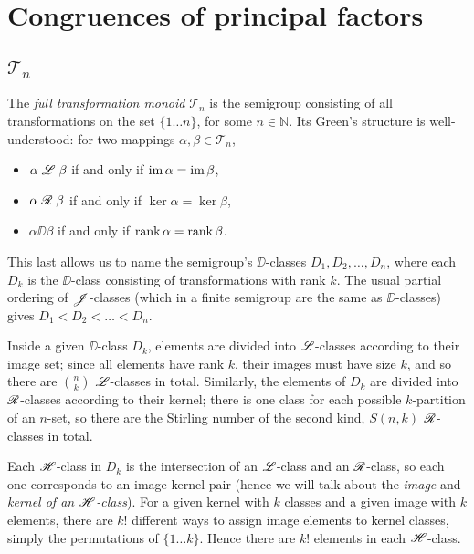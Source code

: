 \chapter{Congruences of principal factors}
\label{chap:princfact}

\section{$\mathcal{T}_n$}
The \textit{full transformation monoid} $\mathcal{T}_n$ is the semigroup consisting of all
transformations on the set $\{1 \dots n\}$, for some $n \in \mathbb{N}$.  Its
Green's structure is well-understood: for two mappings $\alpha, \beta
\in \mathcal{T}_n$,

\begin{itemize}
\item $\alpha \mathrel{\mathscr{L}} \beta$ if and only if $\operatorname{im} \alpha = \operatorname{im} \beta$,
\item $\alpha \mathrel{\mathscr{R}} \beta$ if and only if $\ker \alpha = \ker \beta$,
\item $\alpha \DD \beta$ if and only if $\operatorname{rank} \alpha = \operatorname{rank} \beta$.
\end{itemize}

This last allows us to name the semigroup's $\DD$-classes $D_1, D_2,
\dots, D_n$, where each $D_k$ is the $\DD$-class consisting of
transformations with rank $k$.  The usual partial ordering of
$\mathrel{\mathscr{J}}$-classes \cite[p.47]{howie} (which in a finite semigroup are the
same as $\DD$-classes) gives $D_1 < D_2 < \dots < D_n$.

Inside a given $\DD$-class $D_k$, elements are divided into
$\mathrel{\mathscr{L}}$-classes according to their image set; since all elements have rank
$k$, their images must have size $k$, and so there are $\binom{n}{k}$
$\mathrel{\mathscr{L}}$-classes in total.  Similarly, the elements of $D_k$ are divided
into $\mathrel{\mathscr{R}}$-classes according to their kernel; there is one class for
each possible $k$-partition of an $n$-set, so there are the Stirling number of
the second kind, $S(n,k)$ $\mathrel{\mathscr{R}}$-classes in total.

Each $\mathrel{\mathscr{H}}$-class in $D_k$ is the intersection of an $\mathrel{\mathscr{L}}$-class
and an $\mathrel{\mathscr{R}}$-class, so each one corresponds to an image-kernel pair
(hence we will talk about the \textit{image} and \textit{kernel of an $\mathrel{\mathscr{H}}$-class}).
For a given kernel with $k$ classes and a given image with $k$ elements, there
are $k!$ different ways to assign image elements to kernel classes, simply the
permutations of $\{1 \dots k\}$.  Hence there are $k!$ elements in each
$\mathrel{\mathscr{H}}$-class.

